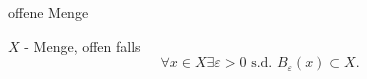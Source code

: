 \documentclass[class=article, crop=false]{standalone}
\begin{document}
\begin{zettel}{offene Menge}
    \begin{definition}[offen]
        $X$ - Menge, offen falls
        \[
            \forall x \in  X \exists \varepsilon > 0 \text{ s.d. } B_\varepsilon(x) \subset X
        .\]
    \end{definition}

\end{zettel}
\end{document}

